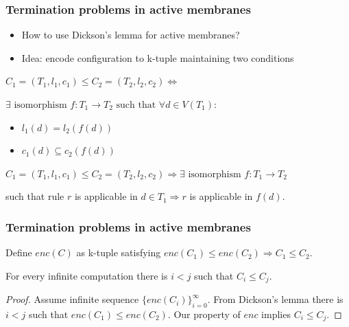     \begin{frame}[t]\frametitle{Termination problems in active membranes}
      \begin{itemize}
        \item How to use Dickson's lemma for active membranes?
        \item Idea: encode configuration to k-tuple maintaining two conditions
      \end{itemize}
      \pause

      \begin{definition}
        $C_1 = (T_1, l_1, c_1) \leq C_2 = (T_2, l_2, c_2) \Leftrightarrow$
      
        $\exists \text{~isomorphism~} f: T_1\rightarrow T_2 \text{~such that~}\forall d\in V(T_1):$
        \begin{itemize}
          \item $l_1(d) = l_2(f(d))$
          \item $c_1(d) \subseteq c_2(f(d))$
        \end{itemize}
      \end{definition}
      \pause
      
      \begin{lemma}
        $C_1 = (T_1, l_1, c_1) \leq C_2 = (T_2, l_2, c_2) \Rightarrow \exists \text{~isomorphism~} f: T_1 \rightarrow T_2$

        such that rule $r$ is applicable in $d\in T_1 \Rightarrow r$ is applicable in $f(d)$.
      \end{lemma}
    \end{frame}

    \begin{frame}[t]\frametitle{Termination problems in active membranes}
      \begin{definition}
        Define $enc(C)$ as k-tuple satisfying $enc(C_1)\leq enc(C_2) \Rightarrow C_1\leq C_2$.
      \end{definition}
      \pause

      \begin{lemma}
        For every infinite computation there is $i<j$ such that $C_i\leq C_j$.
      \end{lemma}
      \pause

      \begin{proof}
        Assume infinite sequence $\{enc(C_i)\}_{i=0}^\infty$. From Dickson's lemma there is $i<j$ such that $enc(C_1)\leq enc(C_2)$. Our property of $enc$ implies $C_i\leq C_j$. 
      \end{proof}
    \end{frame}

